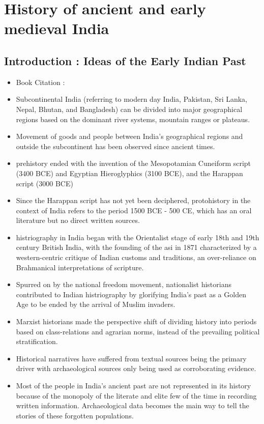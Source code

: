 \chapter{History of ancient and early medieval India}

\section*{Introduction : Ideas of the Early Indian Past}
\begin{itemize}
    \item Book Citation : \cite{Upinder_Singh_2009}
    \item Subcontinental India (referring to modern day India, Pakistan, Sri Lanka, Nepal, Bhutan, and Bangladesh) can be divided into major geographical regions based on the dominant river systems, mountain ranges or plateaus.
    \item Movement of goods and people between India's geographical regions and outside the subcontinent has been observed since ancient times.
    \item \Gls{prehistory} ended with the invention of the Mesopotamian Cuneiform script (3400 BCE) and Egyptian Hieroglyphics (3100 BCE), and the Harappan script (3000 BCE)
    \item Since the Harappan script has not yet been deciphered, \gls{protohistory} in the context of India refers to the period 1500 BCE - 500 CE, which has an oral literature but no direct written sources.
    \item \Gls{histriography} in India began with the Orientalist stage of early 18th and 19th century British India, with the founding of the \gls{asi} in 1871 characterized by a western-centric critique of Indian customs and traditions, an over-reliance on Brahmanical interpretations of scripture.
    \item Spurred on by the national freedom movement, nationalist historians contributed to Indian histriography by glorifying India's past as a Golden Age to be ended by the arrival of Muslim invaders.
    \item Marxist historians made the perspective shift of dividing history into periods based on class-relations and agrarian norms, instead of the prevailing political stratification.
    \item Historical narratives have suffered from textual sources being the primary driver with archaeological sources only being used as corroborating evidence.
    \item Most of the people in India's ancient past are not represented in its history because of the monopoly of the literate and elite few of the time in recording written information. Archaeological data becomes the main way to tell the stories of these forgotten populations.
\end{itemize}

